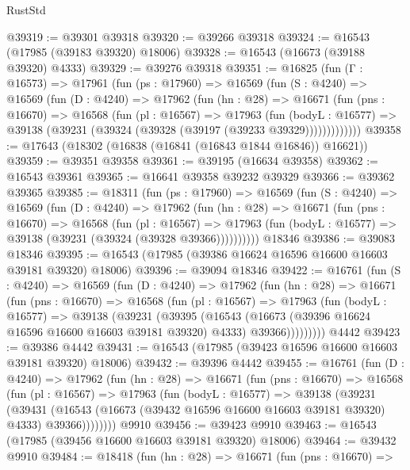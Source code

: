 \begin{lexlean}{RustStd}
\begin{coremodule}
@39319 := @39301 @39318
@39320 := @39266 @39318
@39324 := @16543 (@17985 (@39183 @39320) @18006)
@39328 := @16543 (@16673 (@39188 @39320) @4333)
@39329 := @39276 @39318
@39351 := @16825
    (fun (Γ : @16573) =>
    @17961
      (fun (ps : @17960) =>
      @16569
        (fun (S : @4240) =>
        @16569
          (fun (D : @4240) =>
          @17962
            (fun (hn : @28) =>
            @16671
              (fun (pns : @16670) =>
              @16568
                (fun (pl : @16567) =>
                @17963
                  (fun (bodyL : @16577) =>
                  @39138 (@39231 (@39324 (@39328 (@39197 (@39233 @39329)))))))))))))
@39358 := @17643 (@18302 (@16838 (@16841 (@16843 @1844 @16846)) @16621))
@39359 := @39351 @39358
@39361 := @39195 (@16634 @39358)
@39362 := @16543 @39361
@39365 := @16641 @39358 @39232 @39329
@39366 := @39362 @39365
@39385 := @18311
    (fun (ps : @17960) =>
    @16569
      (fun (S : @4240) =>
      @16569
        (fun (D : @4240) =>
        @17962
          (fun (hn : @28) =>
          @16671
            (fun (pns : @16670) =>
            @16568
              (fun (pl : @16567) =>
              @17963 (fun (bodyL : @16577) => @39138 (@39231 (@39324 (@39328 @39366))))))))))
    @18346
@39386 := @39083 @18346
@39395 := @16543 (@17985 (@39386 @16624 @16596 @16600 @16603 @39181 @39320) @18006)
@39396 := @39094 @18346
@39422 := @16761
    (fun (S : @4240) =>
    @16569
      (fun (D : @4240) =>
      @17962
        (fun (hn : @28) =>
        @16671
          (fun (pns : @16670) =>
          @16568
            (fun (pl : @16567) =>
            @17963
              (fun (bodyL : @16577) =>
              @39138
                (@39231
                  (@39395
                    (@16543
                      (@16673 (@39396 @16624 @16596 @16600 @16603 @39181 @39320) @4333)
                      @39366)))))))))
    @4442
@39423 := @39386 @4442
@39431 := @16543 (@17985 (@39423 @16596 @16600 @16603 @39181 @39320) @18006)
@39432 := @39396 @4442
@39455 := @16761
    (fun (D : @4240) =>
    @17962
      (fun (hn : @28) =>
      @16671
        (fun (pns : @16670) =>
        @16568
          (fun (pl : @16567) =>
          @17963
            (fun (bodyL : @16577) =>
            @39138
              (@39231
                (@39431
                  (@16543 (@16673 (@39432 @16596 @16600 @16603 @39181 @39320) @4333) @39366))))))))
    @9910
@39456 := @39423 @9910
@39463 := @16543 (@17985 (@39456 @16600 @16603 @39181 @39320) @18006)
@39464 := @39432 @9910
@39484 := @18418
    (fun (hn : @28) =>
    @16671
      (fun (pns : @16670) =>

\end{coremodule}
\end{lexlean}
